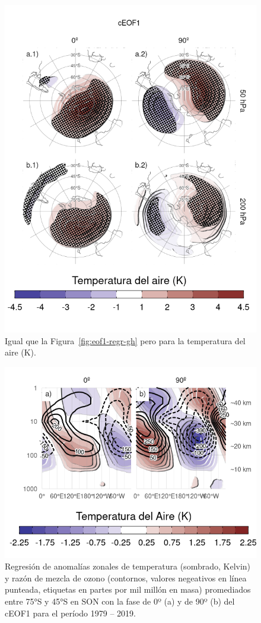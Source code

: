\documentclass[12pt,oneside]{reedthesis}
\begin{document}
\begin{figure}
\includegraphics{figures/20-ceofs/eof1-regr-t-1} \caption{Igual que la Figura~\ref{fig:eof1-regr-gh} pero para la temperatura del aire (K).}\label{fig:eof1-regr-t}
\end{figure}



\begin{figure}
\includegraphics{figures/20-ceofs/t-vertical-1} \caption{Regresión de anomalías zonales de temperatura (sombrado, Kelvin) y razón de mezcla de ozono (contornos, valores negeativos en línea punteada, etiquetas en partes por mil millón en masa) promediados entre 75°S y 45°S en SON con la fase de 0º (a) y de 90º (b) del cEOF1 para el período 1979 -- 2019.}\label{fig:t-vertical}
\end{figure}
\end{document}
